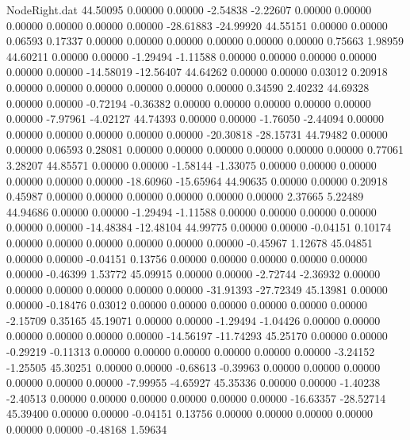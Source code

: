 \begin{filecontents}{NodeRight.dat}
  44.50095    0.00000    0.00000    -2.54838   -2.22607    0.00000    0.00000    0.00000    0.00000    0.00000    0.00000  -28.61883  -24.99920
  44.55151    0.00000    0.00000     0.06593    0.17337    0.00000    0.00000    0.00000    0.00000    0.00000    0.00000    0.75663    1.98959
  44.60211    0.00000    0.00000    -1.29494   -1.11588    0.00000    0.00000    0.00000    0.00000    0.00000    0.00000  -14.58019  -12.56407
  44.64262    0.00000    0.00000     0.03012    0.20918    0.00000    0.00000    0.00000    0.00000    0.00000    0.00000    0.34590    2.40232
  44.69328    0.00000    0.00000    -0.72194   -0.36382    0.00000    0.00000    0.00000    0.00000    0.00000    0.00000   -7.97961   -4.02127
  44.74393    0.00000    0.00000    -1.76050   -2.44094    0.00000    0.00000    0.00000    0.00000    0.00000    0.00000  -20.30818  -28.15731
  44.79482    0.00000    0.00000     0.06593    0.28081    0.00000    0.00000    0.00000    0.00000    0.00000    0.00000    0.77061    3.28207
  44.85571    0.00000    0.00000    -1.58144   -1.33075    0.00000    0.00000    0.00000    0.00000    0.00000    0.00000  -18.60960  -15.65964
  44.90635    0.00000    0.00000     0.20918    0.45987    0.00000    0.00000    0.00000    0.00000    0.00000    0.00000    2.37665    5.22489
  44.94686    0.00000    0.00000    -1.29494   -1.11588    0.00000    0.00000    0.00000    0.00000    0.00000    0.00000  -14.48384  -12.48104
  44.99775    0.00000    0.00000    -0.04151    0.10174    0.00000    0.00000    0.00000    0.00000    0.00000    0.00000   -0.45967    1.12678
  45.04851    0.00000    0.00000    -0.04151    0.13756    0.00000    0.00000    0.00000    0.00000    0.00000    0.00000   -0.46399    1.53772
  45.09915    0.00000    0.00000    -2.72744   -2.36932    0.00000    0.00000    0.00000    0.00000    0.00000    0.00000  -31.91393  -27.72349
  45.13981    0.00000    0.00000    -0.18476    0.03012    0.00000    0.00000    0.00000    0.00000    0.00000    0.00000   -2.15709    0.35165
  45.19071    0.00000    0.00000    -1.29494   -1.04426    0.00000    0.00000    0.00000    0.00000    0.00000    0.00000  -14.56197  -11.74293
  45.25170    0.00000    0.00000    -0.29219   -0.11313    0.00000    0.00000    0.00000    0.00000    0.00000    0.00000   -3.24152   -1.25505
  45.30251    0.00000    0.00000    -0.68613   -0.39963    0.00000    0.00000    0.00000    0.00000    0.00000    0.00000   -7.99955   -4.65927
  45.35336    0.00000    0.00000    -1.40238   -2.40513    0.00000    0.00000    0.00000    0.00000    0.00000    0.00000  -16.63357  -28.52714
  45.39400    0.00000    0.00000    -0.04151    0.13756    0.00000    0.00000    0.00000    0.00000    0.00000    0.00000   -0.48168    1.59634

\end{filecontents}
